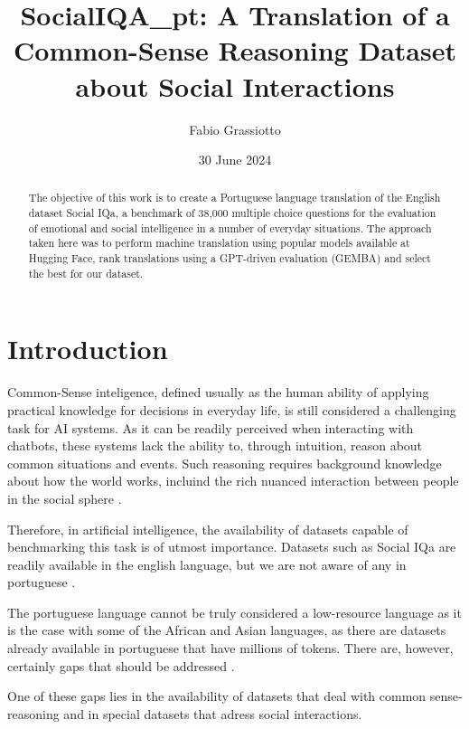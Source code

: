\documentclass{article}
\title{SocialIQA\_pt: A Translation of a Common-Sense Reasoning Dataset about Social Interactions}
\author{Fabio Grassiotto}
\date{30 June 2024}
\begin{document}
\maketitle

\begin{abstract}
    The objective of this work is to create a Portuguese language translation of
    the English dataset Social IQa, a benchmark of 38,000 multiple choice
    questions for the evaluation of emotional and social intelligence in a
    number of everyday situations. The approach taken here was to perform
    machine translation using popular models available at Hugging Face, rank
    translations using a GPT-driven evaluation (GEMBA) and select the best for
    our dataset.
\end{abstract}

\section{Introduction}

Common-Sense inteligence, defined usually as the human ability of applying
practical knowledge for decisions in everyday life, is still considered a
challenging task for AI systems. As it can be readily perceived when interacting
with chatbots, these systems lack the ability to, through intuition, reason
about common situations and events. Such reasoning requires background knowledge
about how the world works, incluind the rich nuanced interaction between people
in the social sphere \cite{choi2022curious, krause2023commonsense}.

Therefore, in artificial intelligence, the availability of datasets capable of
benchmarking this task is of utmost importance. Datasets such as Social IQa are
readily available in the english language, but we are not aware of any in
portuguese \cite{sap2019socialiqa}.

The portuguese language cannot be truly considered a low-resource language as
it is the case with some of the African and Asian languages, as there are
datasets already available in portuguese that have millions of tokens. There
are, however, certainly gaps that should be addressed \cite{ghafoor2021impact}.

One of these gaps lies in the availability of datasets that deal with common
sense-reasoning and in special datasets that adress social interactions.
\end{document}
